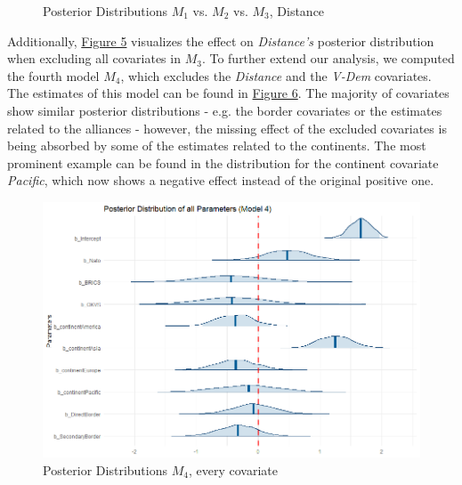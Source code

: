 \documentclass[12pt,a4paper]{article}
\begin{document}
\begin{figure}[h]
\caption{Posterior Distributions $M_1$ vs. $M_2$ vs. $M_3$, Distance}
\end{figure}

Additionally, \hyperref[F:5]{\color{blue}Figure 5} visualizes the effect on \textit{Distance's} posterior distribution when excluding all covariates in $M_3$. To further extend our analysis, we computed the fourth model $M_4$, which excludes the \textit{Distance} and the \textit{V-Dem} covariates. The estimates of this model can be found in \hyperref[F:6]{\color{blue}Figure 6}. The majority of covariates show similar posterior distributions - e.g. the border covariates or the estimates related to the alliances - however, the missing effect of the excluded covariates is being absorbed by some of the estimates related to the continents. The most prominent example can be found in the distribution for the continent covariate \textit{Pacific}, which now shows a negative effect instead of the original positive one.

\begin{figure}[h]
\center
\label{F:6}
\includegraphics[scale=0.5]{PosteriorPlot_Everything_Model4NoDistnace.png}
\caption{Posterior Distributions $M_4$, every covariate}
\end{figure}
\end{document}
